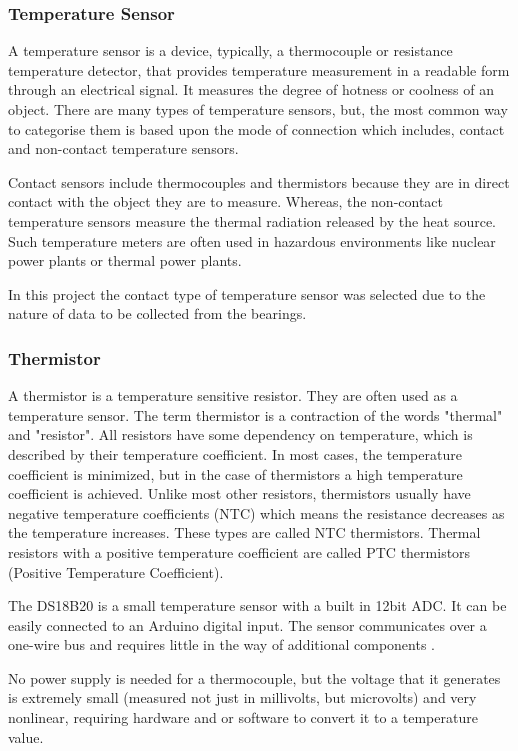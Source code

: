 \subsubsection{Temperature Sensor}
A temperature sensor is a device, typically, a thermocouple or resistance temperature detector, that provides temperature measurement in a readable form through an electrical signal. It measures the degree of hotness or coolness of an object. There are many types of temperature sensors, but, the most common way to categorise them is based upon the mode of connection which includes, contact and non-contact temperature sensors\cite{noauthor_temperature_2019}. 

Contact sensors include thermocouples and thermistors because they are in direct contact with the object they are to measure. Whereas, the non-contact temperature sensors measure the thermal radiation released by the heat source. Such temperature meters are often used in hazardous environments like nuclear power plants or thermal power plants. 

In this project the contact type of temperature sensor was selected due to the nature of data to be collected from the bearings. 
\subsubsection{Thermistor}
A thermistor is a temperature sensitive resistor. They are often used as a temperature sensor. The term thermistor is a contraction of the words "thermal" and "resistor". All resistors have some dependency on temperature, which is described by their temperature coefficient. In most cases, the temperature coefficient is minimized, but in the case of thermistors a high temperature coefficient is achieved. Unlike most other resistors, thermistors usually have negative temperature coefficients (NTC) which means the resistance decreases as the temperature increases. These types are called NTC thermistors. Thermal resistors with a positive temperature coefficient are called PTC thermistors (Positive Temperature Coefficient).

The DS18B20 is a small temperature sensor with a built in 12bit ADC. It can be easily connected to an Arduino digital input. The sensor communicates over a one-wire bus and requires little in the way of additional components \cite{noauthor_learn_nodate}.

No power supply is needed for a thermocouple, but the voltage that it generates is extremely small (measured not just in millivolts, but microvolts) and very nonlinear, requiring hardware and or software to convert it to a temperature value.
